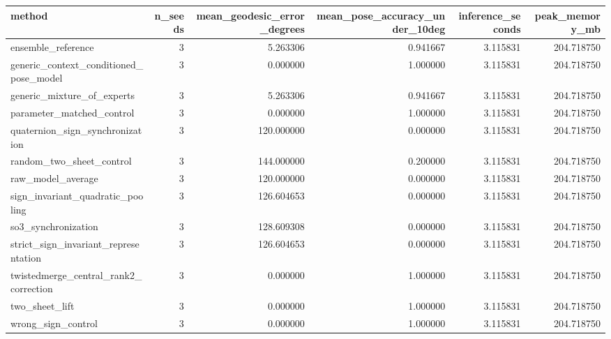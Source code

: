 \begin{tabular}{lrrrrr}
\toprule
method & n_seeds & mean_geodesic_error_degrees & mean_pose_accuracy_under_10deg & inference_seconds & peak_memory_mb \\
\midrule
ensemble_reference & 3 & 5.263306 & 0.941667 & 3.115831 & 204.718750 \\
generic_context_conditioned_pose_model & 3 & 0.000000 & 1.000000 & 3.115831 & 204.718750 \\
generic_mixture_of_experts & 3 & 5.263306 & 0.941667 & 3.115831 & 204.718750 \\
parameter_matched_control & 3 & 0.000000 & 1.000000 & 3.115831 & 204.718750 \\
quaternion_sign_synchronization & 3 & 120.000000 & 0.000000 & 3.115831 & 204.718750 \\
random_two_sheet_control & 3 & 144.000000 & 0.200000 & 3.115831 & 204.718750 \\
raw_model_average & 3 & 120.000000 & 0.000000 & 3.115831 & 204.718750 \\
sign_invariant_quadratic_pooling & 3 & 126.604653 & 0.000000 & 3.115831 & 204.718750 \\
so3_synchronization & 3 & 128.609308 & 0.000000 & 3.115831 & 204.718750 \\
strict_sign_invariant_representation & 3 & 126.604653 & 0.000000 & 3.115831 & 204.718750 \\
twistedmerge_central_rank2_correction & 3 & 0.000000 & 1.000000 & 3.115831 & 204.718750 \\
two_sheet_lift & 3 & 0.000000 & 1.000000 & 3.115831 & 204.718750 \\
wrong_sign_control & 3 & 0.000000 & 1.000000 & 3.115831 & 204.718750 \\
\bottomrule
\end{tabular}

